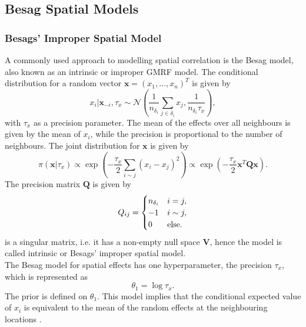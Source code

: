 \subsection{Besag Spatial Models}\label{sec:besag}
\subsubsection{Besags' Improper Spatial Model}
A commonly used approach to modelling spatial correlation is the Besag model, also known as an intrinsic or improper GMRF model. The conditional distribution for a random vector $\pmb{x}=\left(x_1,...,x_n\right)^T$ is given by
\begin{equation}
    x_i|\pmb{x}_{-i},\tau_x\sim\mathcal{N}\left(\frac{1}{n_{\delta_i}}\sum_{j\in\delta_i}x_j,\frac{1}{n_{\delta_i}\tau_x}\right),
\end{equation}
with $\tau_x$ as a precision parameter. The mean of the effects over all neighbours is given by the mean of $x_i$, while the precision is proportional to the number of neighbours. The joint distribution for $\pmb{x}$ is given by
\begin{equation}
    \pi\left(\pmb{x}|\tau_x\right)\propto\exp\left(-\frac{\tau_x}{2}\sum_{i\sim j}\left(x_i-x_j\right)^2\right)\propto\exp\left(-\frac{\tau_x}{2}\pmb{x}^T\pmb{Q}\pmb{x}\right).
\end{equation} \clearpage
The precision matrix $\pmb{Q}$ is given by
\begin{equation}
    Q_{ij}=\begin{cases}
    n_{\delta_i}&i=j,\\
    -1&i\sim j,\\
    0&\hbox{else.}
    \end{cases}
\end{equation}
 is a singular matrix, i.e. it has a non-empty null space $\pmb{V}$, hence the model is called intrinsic or Besags' improper spatial model. \\
The Besag model for spatial effects has one hyperparameter, the precision $\tau_x$, which is represented as
\begin{equation}
    \theta_1 = \log\tau_x.
\end{equation}
The prior is defined on $\theta_1$. This model implies that the conditional expected value of $x_i$ is equivalent to the mean of the random effects at the neighbouring locations \autocite[][]{besag1974spatial, riebler2016intuitive}.
